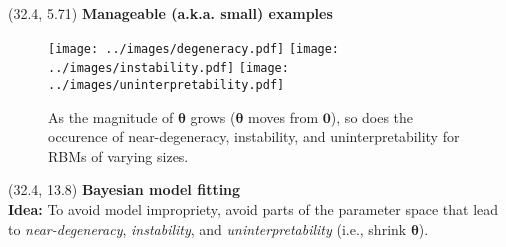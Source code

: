 \documentclass[extrafontsizes, 30pt]{memoir}
\begin{document}
\begin{textblock}{14}(32.4, 5.71)
{\large \bfseries Manageable (a.k.a. small) examples}
\begin{figure}
\centering
\texttt{[image: ../images/degeneracy.pdf]}
\texttt{[image: ../images/instability.pdf]}
\texttt{[image: ../images/uninterpretability.pdf]}
\label{fig:three_ways}
\caption{As the magnitude of $\boldsymbol \theta$ grows ($\boldsymbol \theta$ moves from $\boldsymbol 0$), so does the occurence of near-degeneracy, instability, and uninterpretability for RBMs of varying sizes.}
\end{figure}
\end{textblock}

\begin{textblock}{14}(32.4, 13.8)
{\large \bfseries Bayesian model fitting} \\
{\bfseries Idea:} To avoid model impropriety, avoid parts of the parameter space that lead to \emph{near-degeneracy}, \emph{instability}, and \emph{uninterpretability} (i.e., shrink $\boldsymbol \theta$). \\[-.75cm]


\end{textblock}
\end{document}

